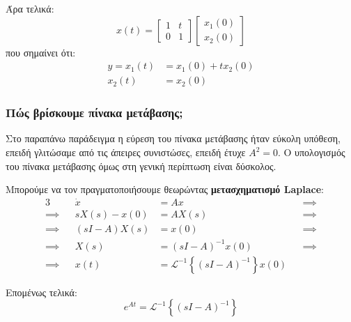 \documentclass[11pt,a4paper,notitlepage,fleqn]{article}
\begin{document}
\begin{exercise}[Παράδειγμα]
	Άρα τελικά:
	\[
	x(t) = \left[\begin{matrix}
	1 & t \\ 0 & 1
	\end{matrix}\right]\left[\begin{matrix}
	x_1(0) \\ x_2(0)
	\end{matrix}\right]
	\]
	που σημαίνει ότι:
	\begin{align*}
		y = x_1(t) &= x_1(0) + tx_2(0)\\
		x_2(t) &= x_2(0)
	\end{align*}

\end{exercise}

\subsubsection{Πώς βρίσκουμε πίνακα μετάβασης;}

Στο παραπάνω παράδειγμα η εύρεση του πίνακα μετάβασης ήταν εύκολη υπόθεση, επειδή γλιτώσαμε από τις άπειρες
συνιστώσες, επειδή έτυχε \( A^2 = 0 \). Ο υπολογισμός του πίνακα μετάβασης όμως στη γενική περίπτωση είναι
δύσκολος.

Μπορούμε να τον πραγματοποιήσουμε θεωρώντας \textbf{μετασχηματισμό Laplace}:
\begin{alignat*}{3}
	&& \dot x &= Ax &&\implies \\
	\implies && sX(s) - x(0) &= AX(s) &&\implies \\
	\implies && (sI-A)X(s) &= x(0) &&\implies \\
	\implies && X(s) &= (sI-A)^{-1} x(0) &&\implies \\
	\implies && x(t) &= \mathscr L^{-1} \left\lbrace (sI-A)^{-1} \right\rbrace x(0)
\end{alignat*}

Επομένως τελικά:
\[
\boxed{e^{At} = \mathscr{L}^{-1} \left\lbrace (sI-A)^{-1} \right\rbrace}
\]
\end{document}
